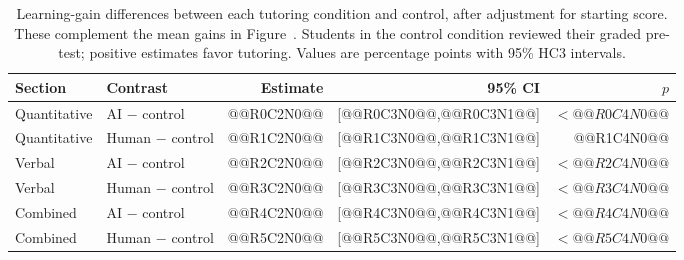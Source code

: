 \begin{table}[H]\centering
\caption{Learning-gain differences between each tutoring condition and control, after adjustment for starting score. These complement the mean gains in Figure~. Students in the control condition reviewed their graded pre-test; positive estimates favor tutoring. Values are percentage points with 95\% HC3 intervals.}\label{tab:adjusted_contrasts}
\begin{tabular}{llrrr}\toprule
Section & Contrast & Estimate & 95\% CI & $p$\\\midrule
Quantitative & AI $-$ control &@@R0C2N0@@&[@@R0C3N0@@,@@R0C3N1@@]&$<@@R0C4N0@@$\\
Quantitative & Human $-$ control &@@R1C2N0@@&[@@R1C3N0@@,@@R1C3N1@@]&@@R1C4N0@@\\
Verbal & AI $-$ control &@@R2C2N0@@&[@@R2C3N0@@,@@R2C3N1@@]&$<@@R2C4N0@@$\\
Verbal & Human $-$ control &@@R3C2N0@@&[@@R3C3N0@@,@@R3C3N1@@]&$<@@R3C4N0@@$\\
Combined & AI $-$ control &@@R4C2N0@@&[@@R4C3N0@@,@@R4C3N1@@]&$<@@R4C4N0@@$\\
Combined & Human $-$ control &@@R5C2N0@@&[@@R5C3N0@@,@@R5C3N1@@]&$<@@R5C4N0@@$\\\bottomrule
\end{tabular}\end{table}